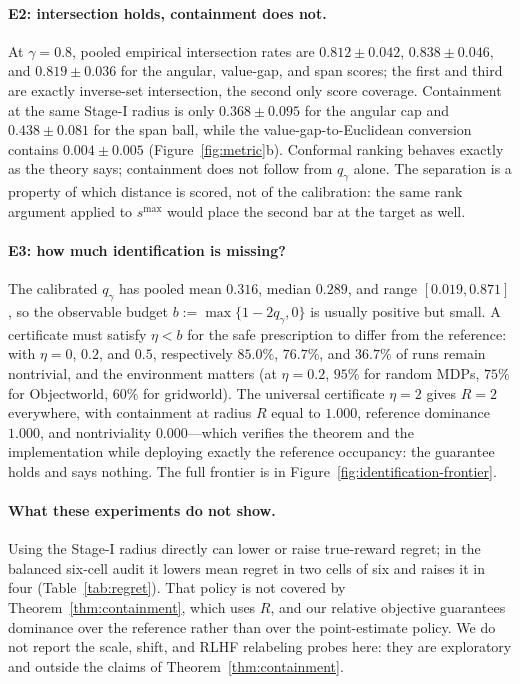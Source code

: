 \documentclass{article}
\begin{document}
\paragraph{E2: intersection holds, containment does not.} At
$\gamma=0.8$, pooled empirical intersection rates are $0.812\pm0.042$,
$0.838\pm0.046$, and $0.819\pm0.036$ for the angular, value-gap, and span
scores; the first and third are exactly inverse-set intersection, the second
only score coverage. Containment at the same Stage-I radius is only
$0.368\pm0.095$ for the angular cap and $0.438\pm0.081$ for the span ball,
while the value-gap-to-Euclidean conversion contains $0.004\pm0.005$
(Figure~\ref{fig:metric}b). Conformal ranking behaves exactly as the theory
says; containment does not follow from $q_\gamma$ alone. The separation is a property of which distance is scored, not
of the calibration: the same rank argument applied to $s^{\max}$ would place the
second bar at the target as well.

\paragraph{E3: how much identification is missing?} The calibrated $q_\gamma$
has pooled mean $0.316$, median $0.289$, and range $[0.019,0.871]$, so the
observable budget $b:=\max\{1-2q_\gamma,0\}$ is usually positive but small. A
certificate must satisfy $\eta<b$ for the safe prescription to differ from the
reference: with $\eta=0$, $0.2$, and $0.5$, respectively $85.0\%$, $76.7\%$,
and $36.7\%$ of runs remain nontrivial, and the environment matters (at
$\eta=0.2$, $95\%$ for random MDPs, $75\%$ for Objectworld, $60\%$ for
gridworld). The universal certificate $\eta=2$ gives $R=2$ everywhere, with
containment at radius $R$ equal to $1.000$, reference dominance $1.000$, and nontriviality
$0.000$---which verifies the theorem and the implementation while deploying
exactly the reference occupancy: the guarantee holds and says nothing. The full
frontier is
in Figure~\ref{fig:identification-frontier}.

\paragraph{What these experiments do not show.} Using the Stage-I radius
directly can lower or raise true-reward regret; in the balanced six-cell audit
it lowers mean regret in two cells of six and raises it in four
(Table~\ref{tab:regret}). That policy is not covered by
Theorem~\ref{thm:containment}, which uses $R$, and our relative objective
guarantees dominance over the reference rather than over the point-estimate
policy. We do not report the scale, shift, and RLHF relabeling probes here:
they are exploratory and outside the claims of Theorem~\ref{thm:containment}.
\end{document}
